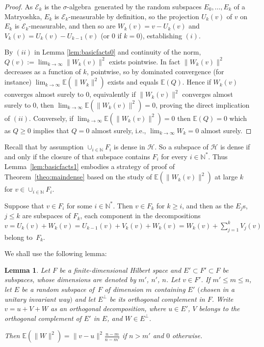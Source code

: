 \documentclass[pdftex]{sigma}%
\newcommand{\hilH}{\mathcal H}
\newcommand{\norm}[1]{\lVert #1\rVert}
\newcommand{\iN}{i\in \mathbb{N}}
\newcommand{\expec}[1]{\mathbb{E}\left(#1\right)}
\newcommand{\algE}{{\mathcal E}}
\newcommand{\salg}{$\sigma$-algebra}
\newtheorem{Lemma}[Theorem]{Lemma}
\begin{document}
\begin{proof}
As $\algE_k$ is the \salg\ generated by the random subspaces $E_0,\dots,E_k$ of a Matryoshka, $E_k$ is $\algE_k$-measurable by definition, so the projection $U_k(v)$ of $v$ on $E_k$ is $\algE_k$-measurable, and then so are $W_k(v)=v-U_k(v)$ and $V_k(v)=U_k(v)-U_{k-1}(v)$ (or $0$ if $k=0$), establishing $(i)$.

By $(ii)$ in Lemma \ref{lem:basicfacts0} and continuity of the norm, $Q(v):=\lim_{k\to \infty}\norm{W_k(v)}^2$ exists pointwise. In fact $\norm{W_k(v)}^2$ decreases as a function of $k$, pointwise, so by dominated convergence (for instance) $\lim_{k\to \infty} \expec{\norm{W_k}^2}$ exists and equals $\expec{Q}$. Hence if $W_k(v)$ converges almost surely to $0$, equivalently if $\norm{W_k(v)}^2$ converges almost surely to $0$, then $\lim_{k\to \infty} \expec{\norm{W_k(v)}^2}=0$, proving the direct implication of $(ii)$. Conversely, if $\lim_{k\to \infty} \expec{\norm{W_k(v)}^2}=0$ then $\expec{Q}=0$ which as $Q\geq 0$ implies that $Q=0$ almost surely, i.e., $\lim_{k\to \infty} W_k=0$ almost surely.
\end{proof}

Recall that by assumption $\cup_{\iN}F_i$ is dense in $\hilH$. So a subspace of $\hilH$ is dense if and only if the closure of that subspace contains $F_i$ for every $\iN^*$. Thus Lemma~\ref{lem:basicfacts1} embodies a strategy of proof of Theorem~\ref{theo:maindense} based on the study of $\expec{\norm{W_k(v)}^2}$ at large $k$ for $v\in \cup_{\iN}F_i$.

Suppose that $v\in F_i$ for some $\iN^*$. Then $v\in F_k$ for $k\geq i$, and then as the $E_j$s, $j\leq k$ are subspaces of $F_k$, each component in the decompositions $v=U_k(v)+W_k(v)=U_{k-1}(v)+V_k(v)+W_k(v)=W_k(v)+\sum_{j=1}^k V_j(v)$ belong to~$F_k$.

We shall use the following lemma:

\begin{Lemma}
Let $F$ be a finite-dimensional Hilbert space and $E'\subset F'\subset F$ be subspaces, whose dimensions are denoted by $m'$, $n'$, $n$. Let $v\in F'$. If $m'\leq m\leq n$, let $E$ be a random subspace of~$F$ of dimension $m$ containing $E'$ $($chosen in a unitary invariant way$)$ and let $E^{\perp}$ be its orthogonal complement in $F$. Write $v=u+V+W$ as an orthogonal decomposition, where $u\in E'$, $V$ belongs to the orthogonal complement of $E'$ in $E$, and $W \in E^{\perp}$.

Then $\expec{\norm{W}^2}=\norm{v-u}^2\frac{n-m}{n-m'}$ if $n>m'$ and $0$ otherwise.
\end{Lemma}
\end{document}

